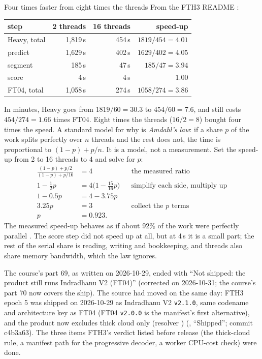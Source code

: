\begin{worked}[label={we:heavy:threads}]{Four times faster from eight times the threads}
From the FTH3 README :
\begin{center}\small
\begin{tabular}{lrrr}
\toprule
step & 2 threads & 16 threads & speed-up\\
\midrule
Heavy, total & 1{,}819\,s & 454\,s & $1819/454=4.01$\\
\quad predict & 1{,}629\,s & 402\,s & $1629/402=4.05$\\
\quad segment & 185\,s & 47\,s & $185/47=3.94$\\
\quad score & 4\,s & 4\,s & $1.00$\\
FT04, total & 1{,}058\,s & 274\,s & $1058/274=3.86$\\
\bottomrule
\end{tabular}
\end{center}
In minutes, Heavy goes from $1819/60=30.3$ to $454/60=7.6$, and still costs $454/274=1.66$ times FT04.
Eight times the threads ($16/2=8$) bought four times the speed. A standard model for why is \emph{Amdahl's
law}: if a share $p$ of the work splits perfectly over $n$ threads and the rest does not, the time
is proportional to $(1-p)+p/n$. It is a model, not a measurement. Set the speed-up from 2 to 16 threads to 4 and
solve for $p$:
\begin{align*}
\frac{(1-p)+p/2}{(1-p)+p/16} &= 4 &&\text{the measured ratio}\\
1-\tfrac12p &= 4\big(1-\tfrac{15}{16}p\big) &&\text{simplify each side, multiply up}\\
1-0.5p &= 4-3.75p\\
3.25p &= 3 &&\text{collect the $p$ terms}\\
p &= 0.923 .
\end{align*}
The measured speed-up behaves as if about 92\% of the work were perfectly parallel \tagC. The score step did not speed up
at all, but at 4\,s it is a small part; the rest of the serial share is reading, writing and bookkeeping, and threads also
share memory bandwidth, which the law ignores.
\end{worked}

\begin{sourcenote}
The course's part 69, as written on 2026-10-29, ended with ``Not shipped: the product still runs Indradhanu V2 (FT04)''
(corrected on 2026-10-31; the course's part 70 now covers the ship). The source had moved on the same day:
FTH3 epoch 5 was shipped on 2026-10-29 as Indradhanu V2 \texttt{v2.1.0}, same codename and architecture key as FT04
(FT04 \texttt{v2.0.0} is the manifest's first alternative), and the product now excludes thick cloud only (resolver
) (, ``Shipped''; commit c4b3a63). The three items FTH3's verdict listed before
release (the thick-cloud rule, a manifest path for the progressive decoder, a worker CPU-cost check) were done.
\end{sourcenote}

